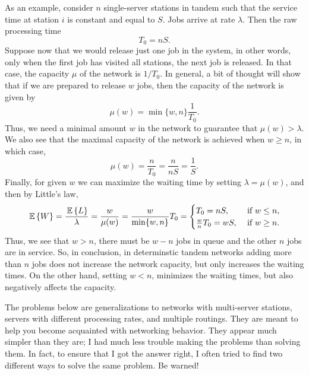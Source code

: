 As an example, consider $n$ single-server stations in tandem such that
the service time  at station $i$ is constant and equal to
$S$. Jobs arrive at rate $\lambda$. Then  the raw processing time 
\begin{equation*}
  T_0= n S.
\end{equation*}
Suppose now that we would release just one job in the system, in other
words, only when the first job has visited all stations, the next job
is released. In that case, the capacity $\mu$ of the network is
$1/T_0$. In general, a bit of thought will show that if we are
prepared to release $w$ jobs, then the capacity of the network is
given by
\begin{equation*}
  \mu(w) = \min\{w, n\} \frac 1{T_0}.
\end{equation*}
Thus, we need a minimal amount $w$ in the network to guarantee that
$\mu(w)> \lambda$. We also see that the maximal capacity of the
network is achieved when $w\geq n$, in which case,
\begin{equation*}
  \mu(w) = \frac{n}{T_0} = \frac{n}{n S} = \frac 1S.
\end{equation*}
Finally, for given $w$ we can maximize the waiting time by setting
$\lambda = \mu(w)$, and then by Little's law,
\begin{equation*}
  \begin{split}
  \,\mathbb{E}\left\{W\right\} 
= \frac{\,\mathbb{E}\left\{L\right\}}{\lambda} = \frac{w}{\mu(w)} = \frac{w}{\min\{w, n\}} T_0 
=
\begin{cases}
  T_0=nS, & \text{ if } w\leq n, \\
  \frac{w}{n} T_0 = w S, & \text{ if } w\geq n.
\end{cases}
  \end{split}
\end{equation*}
Thus, we see that $w>n$, there must be $w-n$ jobs in queue and the
other $n$ jobs are in service. So, in conclusion, in determinstic
tandem networks adding more than $n$ jobs does not increase the
network capacity, but only increases the waiting times. On the other
hand, setting $w<n$, minimizes the waiting times, but also negatively
affects the capacity.

The problems below are generalizations to networks with multi-server
stations, servers with different processing rates, and multiple
routings. They are meant to help you become acquainted with networking
behavior. They appear much simpler than they are; I had much less
trouble making the problems than solving them. In fact, to ensure that
I got the answer right, I often tried to find two different ways to
solve the same problem. Be warned!

